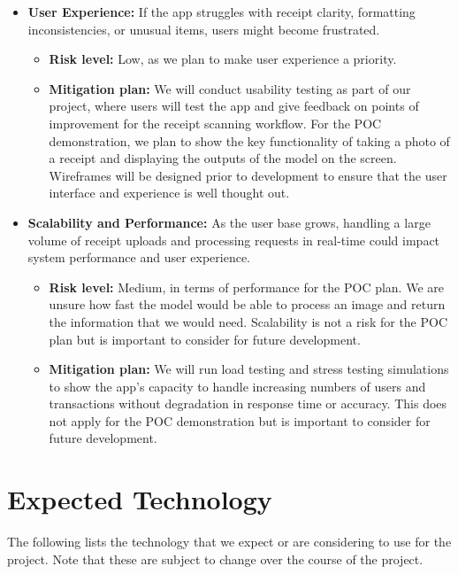 \documentclass{article}
\begin{document}
\begin{itemize}
    \item \textbf{User Experience:} If the app struggles with receipt clarity,
    formatting inconsistencies, or unusual items, users might become frustrated.
    \begin{itemize}
        \item \textbf{Risk level:} Low, as we plan to make user experience a
        priority.
        \item \textbf{Mitigation plan:} We will conduct usability testing as
        part of our project, where users will test the app and give feedback on
        points of improvement for the receipt scanning workflow. For the POC
        demonstration, we plan to show the key functionality of taking a photo
        of a receipt and displaying the outputs of the model on the screen.
        Wireframes will be designed prior to development to ensure that the user
        interface and experience is well thought out.
    \end{itemize}
    
    \item \textbf{Scalability and Performance:} As the user base grows, handling
    a large volume of receipt uploads and processing requests in real-time could
    impact system performance and user experience.
    \begin{itemize}
        \item \textbf{Risk level:} Medium, in terms of performance for the POC
        plan. We are unsure how fast the model would be able to process an image
        and return the information that we would need. Scalability is not a risk
        for the POC plan but is important to consider for future development.
        \item \textbf{Mitigation plan:} We will run load testing and stress
        testing simulations to show the app’s capacity to handle increasing
        numbers of users and transactions without degradation in response time
        or accuracy. This does not apply for the POC demonstration but is
        important to consider for future development.
    \end{itemize}
\end{itemize}

\newpage

\section{Expected Technology}

The following lists the technology that we expect or are considering to use for
the project. Note that these are subject to change over the course of the
project.
\end{document}
